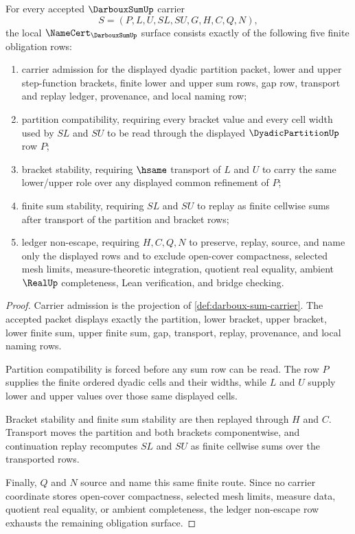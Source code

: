 \begin{theorem}\label{thm:darboux-sum-namecert-obligations}
For every accepted $\DarbouxSumUp$ carrier
$$
S=(P,L,U,SL,SU,G,H,C,Q,N),
$$
the local $\NameCert_{\DarbouxSumUp}$ surface consists exactly of the following five finite obligation rows:
\begin{enumerate}
\item carrier admission for the displayed dyadic partition packet, lower and upper step-function brackets, finite lower and upper sum rows, gap row, transport and replay ledger, provenance, and local naming row;
\item partition compatibility, requiring every bracket value and every cell width used by $SL$ and $SU$ to be read through the displayed $\DyadicPartitionUp$ row $P$;
\item bracket stability, requiring $\hsame$ transport of $L$ and $U$ to carry the same lower/upper role over any displayed common refinement of $P$;
\item finite sum stability, requiring $SL$ and $SU$ to replay as finite cellwise sums after transport of the partition and bracket rows;
\item ledger non-escape, requiring $H,C,Q,N$ to preserve, replay, source, and name only the displayed rows and to exclude open-cover compactness, selected mesh limits, measure-theoretic integration, quotient real equality, ambient $\RealUp$ completeness, Lean verification, and bridge checking.
\end{enumerate}
\end{theorem}
\begin{proof}
Carrier admission is the projection of \autoref{def:darboux-sum-carrier}. The accepted packet displays exactly the partition, lower bracket, upper bracket, lower finite sum, upper finite sum, gap, transport, replay, provenance, and local naming rows.

Partition compatibility is forced before any sum row can be read. The row $P$ supplies the finite ordered dyadic cells and their widths, while $L$ and $U$ supply lower and upper values over those same displayed cells.

Bracket stability and finite sum stability are then replayed through $H$ and $C$. Transport moves the partition and both brackets componentwise, and continuation replay recomputes $SL$ and $SU$ as finite cellwise sums over the transported rows.

Finally, $Q$ and $N$ source and name this same finite route. Since no carrier coordinate stores open-cover compactness, selected mesh limits, measure data, quotient real equality, or ambient completeness, the ledger non-escape row exhausts the remaining obligation surface.
\end{proof}


